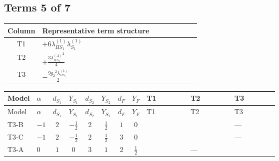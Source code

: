 \documentclass[8pt]{article}
\begin{document}
\begin{landscape}
\subsection*{Terms 5 of 7}
\begin{center}
\begin{tabular}{@{}c >{\raggedright\arraybackslash}p{0.82\linewidth}@{}}
\toprule
Column & Representative term structure \\
\midrule
T1 & \(\displaystyle +6 {\lambda_{HS_1}^{(1)}} {\lambda_{S_1}^{(1)}}\) \\
\midrule
T2 & \(\displaystyle +\frac{3 {\lambda_{HS_1}^{(A)}}^2}{4}\) \\
\midrule
T3 & \(\displaystyle -\frac{9 {g_2}^2 {\lambda_{HS_1}^{(1)}}}{2}\) \\
\midrule
\bottomrule
\end{tabular}
\end{center}
\smallskip
\tiny
\begin{longtable}{@{}llcccccc >{\raggedright\arraybackslash}p{0.21\linewidth} >{\raggedright\arraybackslash}p{0.21\linewidth} >{\raggedright\arraybackslash}p{0.21\linewidth}@{}}
\toprule
Model & $\alpha$ & $d_{S_1}$ & $Y_{S_1}$ & $d_{S_2}$ & $Y_{S_2}$ & $d_F$ & $Y_F$ & T1 & T2 & T3 \\
\midrule
\endfirsthead
\toprule
Model & $\alpha$ & $d_{S_1}$ & $Y_{S_1}$ & $d_{S_2}$ & $Y_{S_2}$ & $d_F$ & $Y_F$ & T1 & T2 & T3 \\
\midrule
\endhead
T3-B & $-1$ & $2$ & $-\frac{1}{2}$ & $2$ & $\frac{1}{2}$ & $1$ & $0$ & \scriptsize\adjustbox{max width=\linewidth}{$\begin{gathered} +6 {\lambda_{HS_1}^{(1)}} {\lambda_{S_1}^{(1)}}\end{gathered}$} & \scriptsize\adjustbox{max width=\linewidth}{$\begin{gathered} +\frac{3 {\lambda_{HS_1}^{(A)}}^2}{4}\end{gathered}$} & --- \\
\midrule
T3-C & $-1$ & $2$ & $-\frac{1}{2}$ & $2$ & $\frac{1}{2}$ & $3$ & $0$ & \scriptsize\adjustbox{max width=\linewidth}{$\begin{gathered} +6 {\lambda_{HS_1}^{(1)}} {\lambda_{S_1}^{(1)}}\end{gathered}$} & \scriptsize\adjustbox{max width=\linewidth}{$\begin{gathered} +\frac{3 {\lambda_{HS_1}^{(A)}}^2}{4}\end{gathered}$} & --- \\
\midrule
T3-A & $0$ & $1$ & $0$ & $3$ & $1$ & $2$ & $\frac{1}{2}$ & \scriptsize\adjustbox{max width=\linewidth}{$\begin{gathered} +4 {\lambda_{HS_1}^{(1)}} {\lambda_{S_1}^{(1)}}\end{gathered}$} & --- & \scriptsize\adjustbox{max width=\linewidth}{$\begin{gathered} -\frac{9 {g_2}^2 {\lambda_{HS_1}^{(1)}}}{2}\end{gathered}$} \\

\end{longtable}
\end{landscape}
\end{document}
